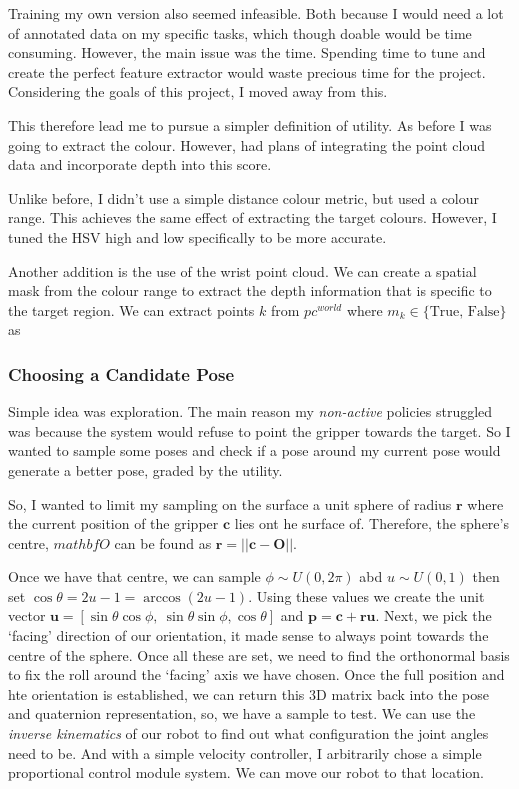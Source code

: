 Training my own version also seemed infeasible. Both because I would need a lot of annotated data on my specific tasks, which though doable would be time consuming. However, the main issue was the time. Spending time to tune and create the perfect feature extractor would waste precious time for the project. Considering the goals of this project, I moved away from this.

This therefore lead me to pursue a simpler definition of utility. As before  I was going to extract the colour. However, had plans of integrating the point cloud data and incorporate depth into this score.

Unlike before, I didn't use a simple distance colour metric, but used a colour range. This achieves the same effect of extracting the target colours. However, I tuned the HSV high and low specifically to be more accurate. 

Another addition is the use of the wrist point cloud. We can create a spatial mask from the colour range to extract the depth information that is specific to the target region. We can extract points $k$ from \( {pc}^{world}\) where \(m_k \in \{ \text{True, False} \}\) as 

\subsubsection{Choosing a Candidate Pose}
Simple idea was exploration. The main reason my \emph{non-active} policies struggled was because the system would refuse to point the gripper towards the target. So I wanted to sample some poses and check if a pose around my current pose would generate a better pose, graded by the utility.

So, I wanted to limit my sampling on the surface a unit sphere of radius $\mathbf{r}$ where the current position of the gripper $\mathbf{c}$ lies ont he surface of. Therefore, the sphere's centre, $mathbf{O}$ can be found as \(\mathbf{r} = || \mathbf{c} - \mathbf{O} || \).

Once we have that centre, we can sample \(\phi \sim U\left(0, 2\pi\right)\) abd \(u\sim U\left(0, 1\right)\) then set \(\cos \theta = 2u - 1 = \arccos\left(2u - 1\right)\). Using these values we create the unit vector \(\mathbf{u} = \left[ \sin\theta\cos\phi, ~\sin\theta\sin\phi, \cos\theta\right]\) and \(\mathbf{p} = \mathbf{c} + \mathbf{ru}\). Next, we pick the `facing' direction of our orientation, it made sense to always point towards the centre of the sphere. Once all these are set, we need to find the orthonormal basis to fix the roll around the  `facing' axis we have chosen. Once the full position and hte orientation is established, we can return this 3D matrix back into the pose and quaternion representation, so, we have a sample to test. We can use the \emph{inverse kinematics} of our robot to find out what configuration the joint angles need to be. And with a simple velocity controller, I arbitrarily chose a simple proportional control module system. We can move our robot to that location.

